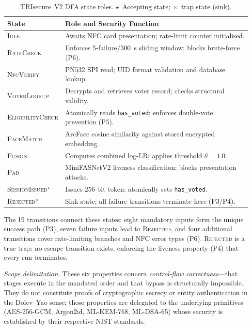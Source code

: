 \documentclass[pdflatex,sn-vancouver-num]{sn-jnl}%
\theoremstyle{thmstyleone}%
\theoremstyle{thmstyletwo}%
\theoremstyle{thmstylethree}%
\begin{document}
\begin{table}[t]
\caption{TRIsecure~V2 DFA state roles.
  $\star$~Accepting state; $\times$~trap state (sink).}
\label{tab:dfa_states}%
\begin{tabular}{|l|p{5.2cm}|}
  \hline
  State & Role and Security Function \\
  \hline
  \textsc{Idle}
    & Awaits NFC card presentation; rate-limit counter initialised. \\
  \textsc{RateCheck}
    & Enforces 5-failure/300~s sliding window; blocks brute-force (P6). \\
  \textsc{NfcVerify}
    & PN532 SPI read; UID format validation and database lookup. \\
  \textsc{VoterLookup}
    & Decrypts and retrieves voter record; checks structural validity. \\
  \textsc{EligibilityCheck}
    & Atomically reads \texttt{has\_voted}; enforces double-vote prevention (P5). \\
  \textsc{FaceMatch}
    & ArcFace cosine similarity against stored encrypted embedding. \\
  \textsc{Fusion}
    & Computes combined log-LR; applies threshold \(\theta{=}1.0\). \\
  \textsc{Pad}
    & MiniFASNetV2 liveness classification; blocks presentation attacks. \\
  \textsc{SessionIssued}$^\star$
    & Issues 256-bit token; atomically sets \texttt{has\_voted}. \\
  \textsc{Rejected}$^\times$
    & Sink state; all failure transitions terminate here (P3/P4). \\
  \hline
\end{tabular}
\end{table}

The 19 transitions connect these states: eight mandatory inputs form the unique
success path (P3), seven failure inputs lead to \textsc{Rejected}, and four
additional transitions cover rate-limiting branches and NFC error types (P6).
\textsc{Rejected} is a true trap: no escape transition exists, enforcing the
liveness property (P4) that every run terminates.

\textit{Scope delimitation.} These six properties concern
\emph{control-flow correctness}---that stages execute in the mandated order and
that bypass is structurally impossible. They do not constitute proofs of
cryptographic secrecy or entity authentication in the Dolev--Yao sense; those
properties are delegated to the underlying primitives (AES-256-GCM, Argon2id,
ML-KEM-768, ML-DSA-65) whose security is established by their respective NIST
standards.
\end{document}
